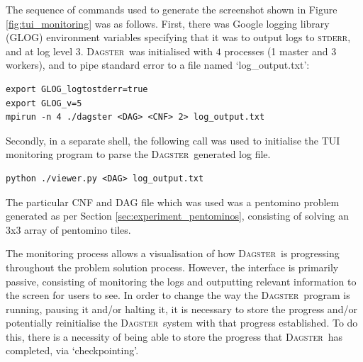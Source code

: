 \documentclass[10pt,a4paper,oneside,headinclude,footinclude,BCOR5mm]{scrartcl}
\newcommand{\dagster}{\textsc{Dagster}\xspace}
\begin{document}
The sequence of commands used to generate the screenshot shown in Figure \ref{fig:tui_monitoring} was as follows.
First, there was Google logging library (GLOG) environment variables specifying that it was to output logs to \textsc{stderr}, and at log level $3$.
\dagster\ was initialised with $4$ processes (1 master and 3 workers), and to pipe standard error to a file named `log\_output.txt':

\begin{Verbatim}[frame=single]
export GLOG_logtostderr=true
export GLOG_v=5
mpirun -n 4 ./dagster <DAG> <CNF> 2> log_output.txt
\end{Verbatim}

Secondly, in a separate shell, the following call was used to initialise the TUI monitoring program to parse the \dagster\ generated log file.

\begin{Verbatim}[frame=single]
python ./viewer.py <DAG> log_output.txt
\end{Verbatim}

The particular CNF and DAG file which was used was a pentomino problem generated as per Section \ref{sec:experiment_pentominos}, consisting of solving an 3x3 array of pentomino tiles.



The monitoring process allows a visualisation of how \dagster\ is progressing throughout the problem solution process.
However, the interface is primarily passive, consisting of monitoring the logs and outputting relevant information to the screen for users to see.
In order to change the way the \dagster\ program is running, pausing it and/or halting it, it is necessary to store the progress and/or potentially reinitialise the \dagster\ system with that progress established.
To do this, there is a necessity of being able to store the progress that \dagster\ has completed, via `checkpointing'.
\end{document}
